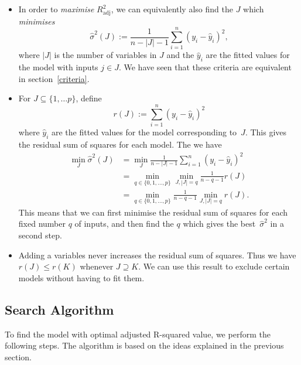 \documentclass[
  a4paper,
]{article}
\theoremstyle{definition}
\theoremstyle{definition}
\theoremstyle{definition}
\theoremstyle{definition}
\theoremstyle{remark}
\begin{document}
\begin{itemize}
\item
  In order to \emph{maximise} \(R^2_\mathrm{adj}\), we can equivalently also
  find the \(J\) which \emph{minimises}
  \begin{equation*}
    \hat\sigma^2(J)
      := \frac{1}{n - |J| - 1} \sum_{i=1}^n (y_i - \hat y_i)^2,
  \end{equation*}
  where \(|J|\) is the number of variables in \(J\) and the
  \(\hat y_i\) are the fitted values for the model with inputs \(j \in J\).
  We have seen that these criteria are equivalent in section~\ref{criteria}.
\item
  For \(J \subseteq \{1, \ldots p\}\), define
  \begin{equation*}
    r(J)
      := \sum_{i=1}^n (y_i - \hat y_i)^2
  \end{equation*}
  where \(\hat y_i\) are the fitted values for the model corresponding to~\(J\).
  This gives the residual sum of squares for each model. The we have
  \begin{align*}
    \min_J \hat\sigma^2(J)
      &= \min_J \frac{1}{n - |J| - 1} \sum_{i=1}^n (y_i - \hat y_i)^2 \\
      &= \min_{q \in \{0, 1, \ldots, p\}} \min_{J, |J|=q} \frac{1}{n - q - 1} r(J) \\
      &= \min_{q \in \{0, 1, \ldots, p\}} \frac{1}{n - q - 1} \min_{J, |J|=q} r(J).
  \end{align*}
  This means that we can first minimise the residual sum of squares
  for each fixed number \(q\) of inputs, and then find the \(q\)
  which gives the best~\(\hat\sigma^2\) in a second step.
\item
  Adding a variables never increases the residual sum of squares.
  Thus we have \(r(J) \leq r(K)\) whenever \(J \supseteq K\).
  We can use this result to exclude certain models without having to fit them.
\end{itemize}

\hypertarget{search-algorithm}{%
\subsection{Search Algorithm}\label{search-algorithm}}

To find the model with optimal adjusted R-squared value, we perform the
following steps. The algorithm is based on the ideas explained in the previous
section.
\end{document}
